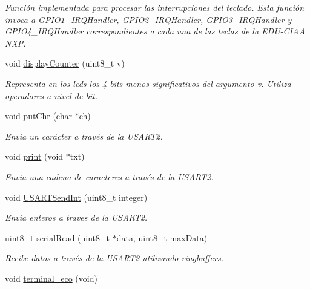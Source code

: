 \begin{DoxyCompactItemize}
\begin{DoxyCompactList}\small\item\em Función implementada para procesar las interrupciones del teclado. Esta función invoca a G\+P\+I\+O1\+\_\+\+I\+R\+Q\+Handler, G\+P\+I\+O2\+\_\+\+I\+R\+Q\+Handler, G\+P\+I\+O3\+\_\+\+I\+R\+Q\+Handler y G\+P\+I\+O4\+\_\+\+I\+R\+Q\+Handler correspondientes a cada una de las teclas de la E\+D\+U-\/\+C\+I\+AA N\+XP. \end{DoxyCompactList}\item 
void \hyperlink{group__operaciones_ga225d51b496ae1f1a31014cd1ff4de057}{display\+Counter} (uint8\+\_\+t v)
\begin{DoxyCompactList}\small\item\em Representa en los leds los 4 bits menos significativos del argumento v. Utiliza operadores a nivel de bit. \end{DoxyCompactList}\item 
void \hyperlink{group__operaciones_gaa9ec69e1f27876226ed140658228b324}{put\+Chr} (char $\ast$ch)
\begin{DoxyCompactList}\small\item\em Envia un carácter a través de la U\+S\+A\+R\+T2. \end{DoxyCompactList}\item 
void \hyperlink{group__operaciones_gaca6d6a4bbbd5abffc2dc954b9762672e}{print} (void $\ast$txt)
\begin{DoxyCompactList}\small\item\em Envia una cadena de caracteres a través de la U\+S\+A\+R\+T2. \end{DoxyCompactList}\item 
void \hyperlink{group__operaciones_gadc4ed2fec1b16a5a140e48f5fc4a35f0}{U\+S\+A\+R\+T\+Send\+Int} (uint8\+\_\+t integer)
\begin{DoxyCompactList}\small\item\em Envia enteros a traves de la U\+S\+A\+R\+T2. \end{DoxyCompactList}\item 
uint8\+\_\+t \hyperlink{group__operaciones_ga7f2a09c30550fe382fea806151b98a6e}{serial\+Read} (uint8\+\_\+t $\ast$data, uint8\+\_\+t max\+Data)
\begin{DoxyCompactList}\small\item\em Recibe datos a través de la U\+S\+A\+R\+T2 utilizando ringbuffers. \end{DoxyCompactList}\item 
void \hyperlink{group__operaciones_gaa0ad709d2e3ee927be33e7d380e70d02}{terminal\+\_\+eco} (void)\hypertarget{group__operaciones_gaa0ad709d2e3ee927be33e7d380e70d02}{}\label{group__operaciones_gaa0ad709d2e3ee927be33e7d380e70d02}


\end{DoxyCompactItemize}
